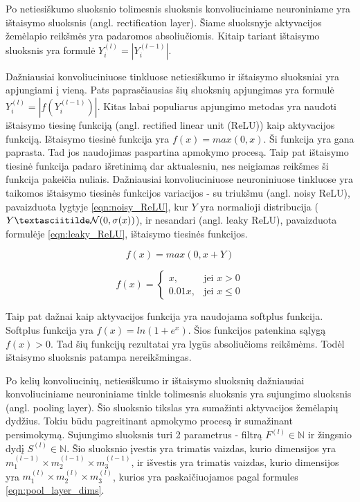 Po netiesiškumo sluoksnio tolimesnis sluoksnis konvoliuciniame neuroniniame yra ištaisymo sluoksnis (angl. rectification layer). Šiame sluoksnyje aktyvacijos žemėlapio reikšmės yra padaromos absoliučiomis. Kitaip tariant ištaisymo sluoksnis yra formulė $Y_i^{(l)} = |Y_i^{(l - 1)}|$.

Dažniausiai konvoliuciniuose tinkluose netiesiškumo ir ištaisymo sluoksniai yra apjungiami į vieną. Pats paprasčiausias šių sluoksnių apjungimas yra formulė  $Y_i^{(l)} = |f(Y_i^{(l - 1)})|$. Kitas labai populiarus apjungimo metodas yra naudoti ištaisymo tiesinę funkciją (angl. rectified linear unit (ReLU)) kaip aktyvacijos funkciją. Ištaisymo tiesinė funkcija yra $f(x) = max(0, x)$. Ši funkcija yra gana paprasta. Tad jos naudojimas paspartina apmokymo procesą. Taip pat ištaisymo tiesinė funkcija padaro išretinimą dar aktualesniu, nes neigiamas reikšmes ši funkcija pakeičia nuliais. Dažniausiai konvoliuciniuose neuroniniuose tinkluose yra taikomos ištaisymo tiesinės funkcijos variacijos - su triukšmu (angl. noisy ReLU), pavaizduota lygtyje \ref{eqn:noisy_ReLU}, kur $Y$ yra normalioji distribucija ($Y \textasciitilde \mathcal{N}(0, \sigma(x))$), ir nesandari (angl. leaky ReLU), pavaizduota formulėje \ref{eqn:leaky_ReLU},  ištaisymo tiesinės funkcijos.

\begin{equation}
\label{eqn:noisy_ReLU}
	f(x) = max(0, x + Y)
\end{equation}

\begin{equation}
\label{eqn:leaky_ReLU}
	f(x) = 
	\begin{cases}
	x, & \mbox{jei } x > 0 \\
	0.01x, & \mbox{jei } x \leq 0
	\end{cases}
\end{equation}

Taip pat dažnai kaip aktyvacijos funkcija yra naudojama softplus funkcija. Softplus funkcija yra $f(x) = ln(1 + e^x)$. Šios funkcijos patenkina sąlygą $f(x) > 0$. Tad šių funkcijų rezultatai yra lygūs absoliučioms reikšmėms. Todėl ištaisymo sluoksnis patampa nereikšmingas.

Po kelių konvoliucinių, netiesiškumo ir ištaisymo sluoksnių dažniausiai konvoliuciniame neuroniniame tinkle tolimesnis sluoksnis yra sujungimo sluoksnis (angl. pooling layer). Šio sluoksnio tikslas yra sumažinti aktyvacijos žemėlapių dydžius. Tokiu būdu pagreitinant apmokymo procesą ir sumažinant persimokymą. Sujungimo sluoksnis turi 2 parametrus - filtrą $F^{(l)} \in \mathbb{N}$ ir žingsnio dydį $S^{(l)} \in \mathbb{N}$. Šio sluoksnio įvestis yra trimatis vaizdas, kurio dimensijos yra $m_1^{(l-1)} \times m_2^{(l-1)} \times m_3^{(l-1)}$, ir išvestis yra trimatis vaizdas, kurio dimensijos yra $m_1^{(l)} \times m_2^{(l)} \times m_3^{(l)}$, kurios yra paskaičiuojamos pagal formules \ref{eqn:pool_layer_dims}.


